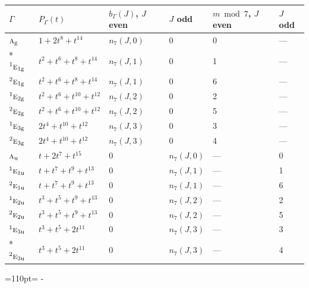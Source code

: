 \documentclass[10pt,a4paper]{article}
\newcommand{\needspace}[1]{\par\penalty-100\begingroup\dimen0=#1\relax\dimen2=\pagegoal
  \advance\dimen2-\pagetotal\ifdim\dimen0>\dimen2\relax\ifdim\dimen2>0pt\vfil\break\fi\fi
  \endgroup}
\numberwithin{equation}{section}
\newcommand{\irr}[1]{\text{\normalfont\scshape #1}}
\newcommand{\conjpair}[1]{{}^{#1}}
\newcommand{\ptag}[1]{\mathrm{#1}}
\begin{document}
{\small\begin{longtable}{@{}llllll@{}}\toprule
$\Gamma$ & $P_\Gamma(t)$ & $b_\Gamma(J)$, $J$ even & $J$ odd & $m \bmod 7$, $J$ even & $J$ odd\\\midrule\endhead
\bottomrule\endfoot\endlastfoot
$\irr{a}_{\ptag{g}}$ & $1 + 2t^{8} + t^{14}$ & $n_{7}(J,0)$ & $0$ & 0 & ---\\*
$\conjpair{1}\irr{e}_{1\ptag{g}}$ & $t^{2} + t^{6} + t^{8} + t^{14}$ & $n_{7}(J,1)$ & $0$ & 1 & ---\\
$\conjpair{2}\irr{e}_{1\ptag{g}}$ & $t^{2} + t^{6} + t^{8} + t^{14}$ & $n_{7}(J,1)$ & $0$ & 6 & ---\\
$\conjpair{1}\irr{e}_{2\ptag{g}}$ & $t^{2} + t^{6} + t^{10} + t^{12}$ & $n_{7}(J,2)$ & $0$ & 2 & ---\\
$\conjpair{2}\irr{e}_{2\ptag{g}}$ & $t^{2} + t^{6} + t^{10} + t^{12}$ & $n_{7}(J,2)$ & $0$ & 5 & ---\\
$\conjpair{1}\irr{e}_{3\ptag{g}}$ & $2t^{4} + t^{10} + t^{12}$ & $n_{7}(J,3)$ & $0$ & 3 & ---\\
$\conjpair{2}\irr{e}_{3\ptag{g}}$ & $2t^{4} + t^{10} + t^{12}$ & $n_{7}(J,3)$ & $0$ & 4 & ---\\
$\irr{a}_{\ptag{u}}$ & $t + 2t^{7} + t^{15}$ & $0$ & $n_{7}(J,0)$ & --- & 0\\
$\conjpair{1}\irr{e}_{1\ptag{u}}$ & $t + t^{7} + t^{9} + t^{13}$ & $0$ & $n_{7}(J,1)$ & --- & 1\\
$\conjpair{2}\irr{e}_{1\ptag{u}}$ & $t + t^{7} + t^{9} + t^{13}$ & $0$ & $n_{7}(J,1)$ & --- & 6\\
$\conjpair{1}\irr{e}_{2\ptag{u}}$ & $t^{3} + t^{5} + t^{9} + t^{13}$ & $0$ & $n_{7}(J,2)$ & --- & 2\\
$\conjpair{2}\irr{e}_{2\ptag{u}}$ & $t^{3} + t^{5} + t^{9} + t^{13}$ & $0$ & $n_{7}(J,2)$ & --- & 5\\
$\conjpair{1}\irr{e}_{3\ptag{u}}$ & $t^{3} + t^{5} + 2t^{11}$ & $0$ & $n_{7}(J,3)$ & --- & 3\\*
$\conjpair{2}\irr{e}_{3\ptag{u}}$ & $t^{3} + t^{5} + 2t^{11}$ & $0$ & $n_{7}(J,3)$ & --- & 4\\
\bottomrule\end{longtable}}
\needspace{110pt}
\end{document}
